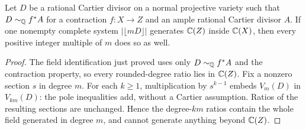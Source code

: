 \begin{lemma}\label{lem:multiples-full-field}
Let $D$ be a rational Cartier divisor on a normal projective variety
such that $D\sim_{\mathbb Q}f^*A$ for a contraction $f:X\to Z$ and an
ample rational Cartier divisor $A$. If one nonempty complete system
$|\lfloor mD\rfloor|$ generates $\mathbb C(Z)$ inside $\mathbb C(X)$, then every
positive integer multiple of $m$ does so as well.
\end{lemma}

\begin{proof}
The field identification just proved uses only $D\sim_\mathbb Q f^*A$
and the contraction property, so every rounded-degree ratio lies in
$\mathbb C(Z)$. Fix a nonzero section $s$ in degree $m$. For each $k\ge1$,
multiplication by $s^{k-1}$ embeds $V_m(D)$ in $V_{km}(D)$: the
pole inequalities add, without a Cartier assumption. Ratios of the
resulting sections are unchanged. Hence the degree-$km$ ratios contain
the whole field generated in degree $m$, and cannot generate anything
beyond $\mathbb C(Z)$.
\end{proof}
